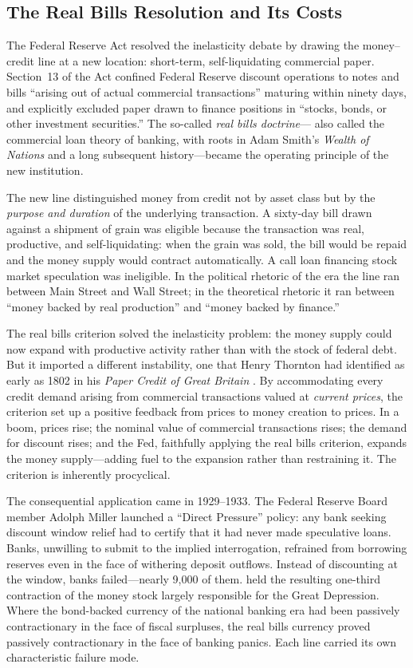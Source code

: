 \documentclass[12pt]{article}
\begin{document}
\subsection{The Real Bills Resolution and Its Costs}

The Federal Reserve Act resolved the inelasticity debate by drawing
the money--credit line at a new location: short-term, self-liquidating
commercial paper.  Section~13 of the Act confined Federal Reserve
discount operations to notes and bills ``arising out of actual
commercial transactions'' maturing within ninety days, and explicitly
excluded paper drawn to finance positions in ``stocks, bonds, or other
investment securities.''  The so-called \emph{real bills doctrine}---
also called the commercial loan theory of banking, with roots in Adam
Smith's \textit{Wealth of Nations} and a long subsequent
history---became the operating principle of the new institution.

The new line distinguished money from credit not by asset class but
by the \emph{purpose and duration} of the underlying transaction.  A
sixty-day bill drawn against a shipment of grain was eligible because
the transaction was real, productive, and self-liquidating: when the
grain was sold, the bill would be repaid and the money supply would
contract automatically.  A call loan financing stock market speculation
was ineligible.  In the political rhetoric of the era the line ran
between Main Street and Wall Street; in the theoretical rhetoric it
ran between ``money backed by real production'' and ``money backed
by finance.''

The real bills criterion solved the inelasticity problem: the money
supply could now expand with productive activity rather than with the
stock of federal debt.  But it imported a different instability, one
that Henry Thornton had identified as early as 1802 in his
\textit{Paper Credit of Great Britain} \citep{Thornton1802}.  By
accommodating every credit demand arising from commercial transactions
valued at \emph{current prices}, the criterion set up a positive
feedback from prices to money creation to prices.  In a boom, prices
rise; the nominal value of commercial transactions rises; the demand for
discount rises; and the Fed, faithfully applying the real bills
criterion, expands the money supply---adding fuel to the expansion
rather than restraining it.  The criterion is inherently procyclical.

The consequential application came in 1929--1933.  The Federal
Reserve Board member Adolph Miller launched a ``Direct Pressure'' policy:
any bank seeking discount window relief had to certify that it had never
made speculative loans.  Banks, unwilling to submit to the implied
interrogation, refrained from borrowing reserves even in the face of
withering deposit outflows.  Instead of discounting at the window, banks
failed---nearly 9{,}000 of them.  \citet{FriedmanSchwartz1963} held
the resulting one-third contraction of the money stock largely
responsible for the Great Depression.  Where the bond-backed currency
of the national banking era had been passively contractionary in the
face of fiscal surpluses, the real bills currency proved passively
contractionary in the face of banking panics.  Each line carried its
own characteristic failure mode.
\end{document}
